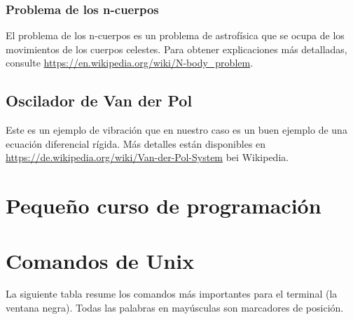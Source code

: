 \documentclass[a4paper,11pt]{article}
\theoremstyle{definition}
\begin{document}
\subsubsection{Problema de los n-cuerpos }
El problema de los n-cuerpos es un problema de astrofísica que se ocupa de los movimientos de los cuerpos celestes. Para obtener explicaciones más detalladas, consulte \url{https://en.wikipedia.org/wiki/N-body_problem}.

\subsection{Oscilador de Van der Pol }
Este es un ejemplo de vibración que en nuestro caso es un buen ejemplo de una ecuación diferencial rígida. Más detalles están disponibles en \url{https://de.wikipedia.org/wiki/Van-der-Pol-System} bei Wikipedia.




\begin{appendices}

\section{Pequeño curso de programación}

\section{Comandos de Unix }
La siguiente tabla resume los comandos más importantes para el terminal (la ventana negra). Todas las palabras en mayúsculas son marcadores de posición.





\end{appendices}



\end{document}
